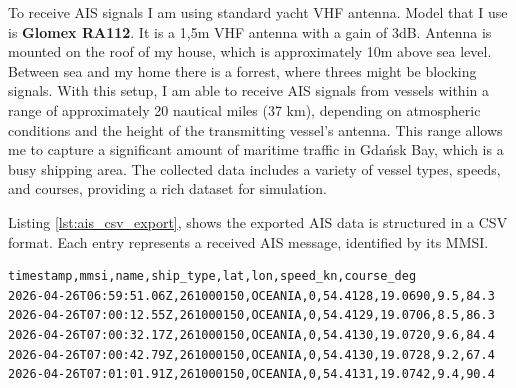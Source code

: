 To receive AIS signals I am using standard yacht VHF antenna. Model that I use is 
 \textbf {Glomex RA112}. It is a 1,5m VHF antenna with a gain of 3dB. Antenna is mounted on the roof of my house, which is approximately 10m above sea level. Between sea and my home there is a forrest, where threes might be blocking signals. With this setup, I am able to receive AIS signals from vessels within a range of approximately 20 nautical miles (37 km), depending on atmospheric conditions and the height of the transmitting vessel's antenna. This range allows me to capture a significant amount of maritime traffic in Gdańsk Bay, which is a busy shipping area. The collected data includes a variety of vessel types, speeds, and courses, providing a rich dataset for simulation.

\vspace{0.5cm}

 Listing \ref{lst:ais_csv_export}, shows the exported AIS data is structured in a CSV format. Each entry represents a received AIS message, identified by its MMSI.

\begin{lstlisting}[style=csvStyle, caption={Subsection of exported AIS telemetry for Oceania.}, label={lst:ais_csv_export}]
timestamp,mmsi,name,ship_type,lat,lon,speed_kn,course_deg
2026-04-26T06:59:51.06Z,261000150,OCEANIA,0,54.4128,19.0690,9.5,84.3
2026-04-26T07:00:12.55Z,261000150,OCEANIA,0,54.4129,19.0706,8.5,86.3
2026-04-26T07:00:32.17Z,261000150,OCEANIA,0,54.4130,19.0720,9.6,84.4
2026-04-26T07:00:42.79Z,261000150,OCEANIA,0,54.4130,19.0728,9.2,67.4
2026-04-26T07:01:01.91Z,261000150,OCEANIA,0,54.4131,19.0742,9.4,90.4
\end{lstlisting}

